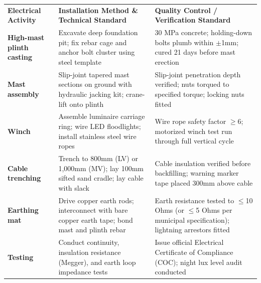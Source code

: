 {\fontsize{7.7pt}{9.8pt}\selectfont
\renewcommand{\arraystretch}{1.23}
\noindent
\begin{tabularx}{\textwidth}{@{}p{3.3cm} p{6.6cm} X@{}}
\rowcolor{mhnavy}
{\color{white}\bfseries Electrical Activity} & {\color{white}\bfseries Installation Method \& Technical Standard} & {\color{white}\bfseries Quality Control / Verification Standard} \\
\rowcolor{mhbluelight}
\bfseries High-mast plinth casting & Excavate deep foundation pit; fix rebar cage and anchor bolt cluster using steel template & 30 MPa concrete; holding-down bolts plumb within $\pm$1mm; cured 21 days before mast erection \\
\bfseries Mast assembly & Slip-joint tapered mast sections on ground with hydraulic jacking kit; crane-lift onto plinth & Slip-joint penetration depth verified; nuts torqued to specified torque; locking nuts fitted \\
\rowcolor{mhbluelight}
\bfseries Winch & Assemble luminaire carriage ring; wire LED floodlights; install stainless steel wire ropes & Wire rope safety factor $\ge$6; motorized winch test run through full vertical cycle \\
\bfseries Cable trenching & Trench to 800mm (LV) or 1,000mm (MV); lay 100mm sifted sand cradle; lay cable with slack & Cable insulation verified before backfilling; warning marker tape placed 300mm above cable \\
\rowcolor{mhbluelight}
\bfseries Earthing mat & Drive copper earth rods; interconnect with bare copper earth tape; bond mast and plinth rebar & Earth resistance tested to $\le$10 Ohms (or $\le$5 Ohms per municipal specification); lightning arrestors fitted \\
\bfseries Testing & Conduct continuity, insulation resistance (Megger), and earth loop impedance tests & Issue official Electrical Certificate of Compliance (COC); night lux level audit conducted \\
\end{tabularx}
\renewcommand{\arraystretch}{1}
}

\vfill

